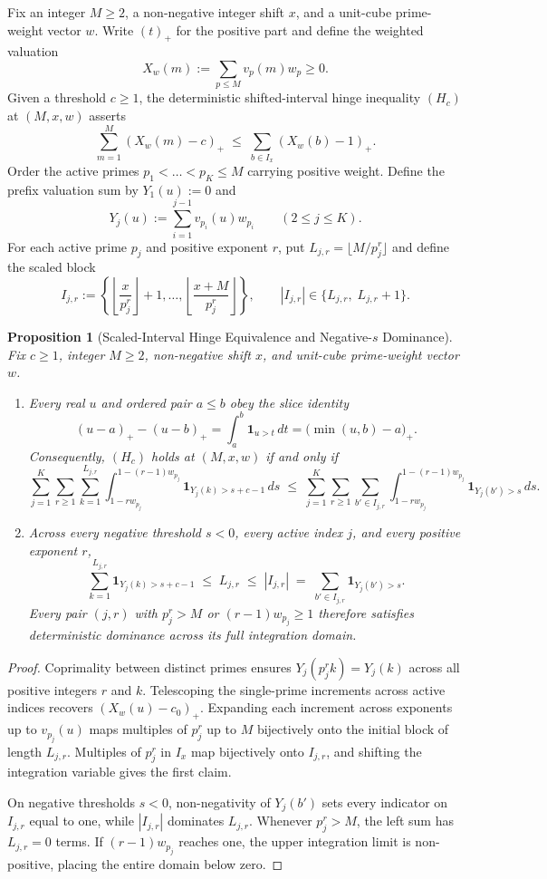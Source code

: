\documentclass[11pt]{article}
\newtheorem{proposition}[theorem]{Proposition}
\begin{document}
Fix an integer $M \ge 2$, a non-negative integer shift $x$, and a unit-cube prime-weight vector $w$. Write $(t)_+$ for the positive part and define the weighted valuation
\[
X_w(m) := \sum_{p \le M} v_p(m) w_p \ge 0.
\]
Given a threshold $c \ge 1$, the deterministic shifted-interval hinge inequality $(H_c)$ at $(M, x, w)$ asserts
\[
\sum_{m = 1}^M (X_w(m) - c)_+ \;\le\; \sum_{b \in I_x} (X_w(b) - 1)_+.
\]
Order the active primes $p_1 < \dots < p_K \le M$ carrying positive weight. Define the prefix valuation sum by $Y_1(u) := 0$ and
\[
Y_j(u) := \sum_{i = 1}^{j - 1} v_{p_i}(u) w_{p_i} \qquad (2 \le j \le K).
\]
For each active prime $p_j$ and positive exponent $r$, put $L_{j, r} = \lfloor M / p_j^r \rfloor$ and define the scaled block
\[
I_{j, r} := \left\{\left\lfloor \frac{x}{p_j^r} \right\rfloor + 1, \dots, \left\lfloor \frac{x + M}{p_j^r} \right\rfloor\right\}, \qquad |I_{j, r}| \in \{L_{j, r},\; L_{j, r} + 1\}.
\]

\begin{proposition}[Scaled-Interval Hinge Equivalence and Negative-$s$ Dominance]
\label{prop:equiv}
Fix $c \ge 1$, integer $M \ge 2$, non-negative shift $x$, and unit-cube prime-weight vector $w$.
\begin{enumerate}
\item Every real $u$ and ordered pair $a \le b$ obey the slice identity
\[
(u - a)_+ - (u - b)_+ = \int_a^b \mathbf{1}_{u > t}\,dt = \bigl(\min(u, b) - a\bigr)_+.
\]
Consequently, $(H_c)$ holds at $(M, x, w)$ if and only if
\[
\sum_{j = 1}^K \sum_{r \ge 1} \sum_{k = 1}^{L_{j, r}} \int_{1 - r w_{p_j}}^{1 - (r - 1) w_{p_j}} \mathbf{1}_{Y_j(k) > s + c - 1}\,ds
\;\le\;
\sum_{j = 1}^K \sum_{r \ge 1} \sum_{b' \in I_{j, r}} \int_{1 - r w_{p_j}}^{1 - (r - 1) w_{p_j}} \mathbf{1}_{Y_j(b') > s}\,ds.
\]
\item Across every negative threshold $s < 0$, every active index $j$, and every positive exponent $r$,
\[
\sum_{k = 1}^{L_{j, r}} \mathbf{1}_{Y_j(k) > s + c - 1} \;\le\; L_{j, r} \;\le\; |I_{j, r}| \;=\; \sum_{b' \in I_{j, r}} \mathbf{1}_{Y_j(b') > s}.
\]
Every pair $(j, r)$ with $p_j^r > M$ or $(r - 1) w_{p_j} \ge 1$ therefore satisfies deterministic dominance across its full integration domain.
\end{enumerate}
\end{proposition}
\begin{proof}
Coprimality between distinct primes ensures $Y_j(p_j^r k) = Y_j(k)$ across all positive integers $r$ and $k$. Telescoping the single-prime increments across active indices recovers $(X_w(u) - c_0)_+$. Expanding each increment across exponents up to $v_{p_j}(u)$ maps multiples of $p_j^r$ up to $M$ bijectively onto the initial block of length $L_{j, r}$. Multiples of $p_j^r$ in $I_x$ map bijectively onto $I_{j, r}$, and shifting the integration variable gives the first claim.

On negative thresholds $s < 0$, non-negativity of $Y_j(b')$ sets every indicator on $I_{j, r}$ equal to one, while $|I_{j, r}|$ dominates $L_{j, r}$. Whenever $p_j^r > M$, the left sum has $L_{j, r} = 0$ terms. If $(r - 1) w_{p_j}$ reaches one, the upper integration limit is non-positive, placing the entire domain below zero.
\end{proof}
\end{document}
